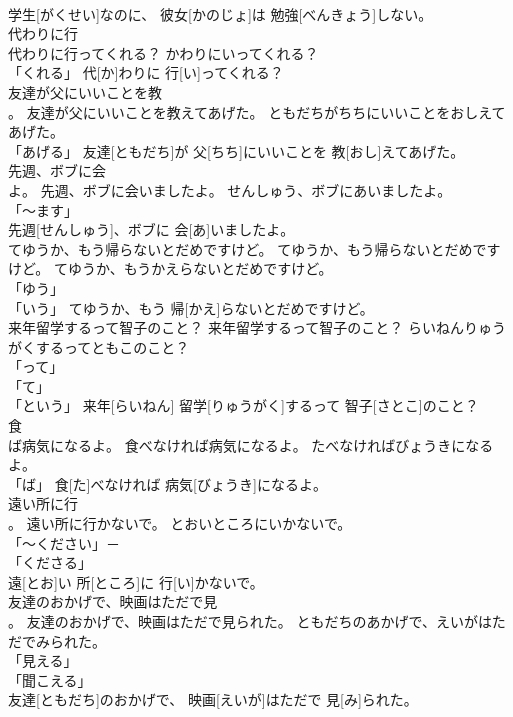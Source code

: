 \documentclass[8pt]{extreport}
\begin{document}
\begin{CJK}{UTF8}{min}
\\	学生[がくせい]なのに、 彼女[かのじょ]は 勉強[べんきょう]しない。		
\\	代わりに行
\\	代わりに行ってくれる？	かわりにいってくれる？	
\\	「くれる」	代[か]わりに 行[い]ってくれる？		
\\	友達が父にいいことを教
\\	。	友達が父にいいことを教えてあげた。	ともだちがちちにいいことをおしえてあげた。	
\\	「あげる」	友達[ともだち]が 父[ちち]にいいことを 教[おし]えてあげた。		
\\	先週、ボブに会
\\	よ。	先週、ボブに会いましたよ。	せんしゅう、ボブにあいましたよ。	
\\	「～ます」 
\\	先週[せんしゅう]、ボブに 会[あ]いましたよ。		
\\	てゆうか、もう帰らないとだめですけど。	てゆうか、もう帰らないとだめですけど。	てゆうか、もうかえらないとだめですけど。	
\\	「ゆう」 
\\	「いう」	てゆうか、もう 帰[かえ]らないとだめですけど。		
\\	来年留学するって智子のこと？	来年留学するって智子のこと？	らいねんりゅうがくするってともこのこと？	
\\	「って」 
\\	「て」 
\\	「という」	来年[らいねん] 留学[りゅうがく]するって 智子[さとこ]のこと？		
\\	食
\\	ば病気になるよ。	食べなければ病気になるよ。	たべなければびょうきになるよ。	
\\	「ば」	食[た]べなければ 病気[びょうき]になるよ。		
\\	遠い所に行
\\	。	遠い所に行かないで。	とおいところにいかないで。	
\\	「～ください」－ 
\\	「くださる」　
\\	遠[とお]い 所[ところ]に 行[い]かないで。		
\\	友達のおかげで、映画はただで見
\\	。	友達のおかげで、映画はただで見られた。	ともだちのあかげで、えいがはただでみられた。	
\\	「見える」 
\\	「聞こえる」 
\\	友達[ともだち]のおかげで、 映画[えいが]はただで 見[み]られた。		

\end{CJK}
\end{document}
